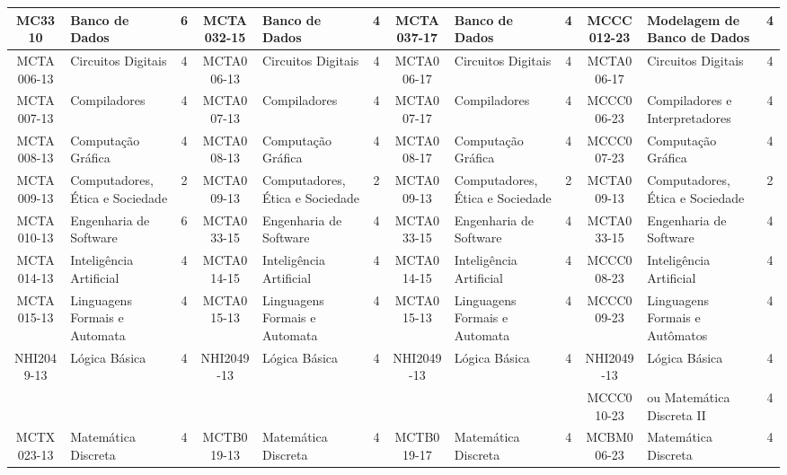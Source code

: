 \documentclass[a4paper]{article}
\begin{document}
\begin{landscape}
{\begin{longtable}{|c|p{.2\textheight}|c||c|p{.2\textheight}|c||c|p{.2\textheight}|c||c|p{.2\textheight}|c|}
    MC3310 & Banco de Dados & 6 &
    MCTA032-15 & Banco de Dados & 4 &
    MCTA037-17 & Banco de Dados & 4 &
    MCCC012-23 & Modelagem de Banco de Dados & 4 \\ \hline

    MCTA006-13 & Circuitos Digitais & 4 &
    MCTA006-13 & Circuitos Digitais & 4 &
    MCTA006-17 & Circuitos Digitais & 4 &
    MCTA006-17 & Circuitos Digitais & 4 \\ \hline

    MCTA007-13 & Compiladores & 4 &
    MCTA007-13 & Compiladores & 4 &
    MCTA007-17 & Compiladores & 4 & 
    MCCC006-23 & Compiladores e Interpretadores & 4 \\ \hline

    MCTA008-13 & Computação Gráfica & 4 &
    MCTA008-13 & Computação Gráfica & 4 &
    MCTA008-17 & Computação Gráfica & 4 &
    MCCC007-23 & Computação Gráfica & 4 \\ \hline

    MCTA009-13 & Computadores, Ética e Sociedade & 2 &
    MCTA009-13 & Computadores, Ética e Sociedade & 2 &
    MCTA009-13 & Computadores, Ética e Sociedade & 2 &
    MCTA009-13 & Computadores, Ética e Sociedade & 2 \\ \hline

    MCTA010-13 & Engenharia de Software & 6 &
    MCTA033-15 & Engenharia de Software & 4 & 
    MCTA033-15 & Engenharia de Software & 4 & 
    MCTA033-15 & Engenharia de Software & 4 \\ \hline

    MCTA014-13 & Inteligência Artificial & 4 &
    MCTA014-15 & Inteligência Artificial & 4 & 
    MCTA014-15 & Inteligência Artificial & 4 &
    MCCC008-23 & Inteligência Artificial & 4 \\ \hline

    MCTA015-13 & Linguagens Formais e Automata & 4 &
    MCTA015-13 & Linguagens Formais e Automata & 4 &
    MCTA015-13 & Linguagens Formais e Automata & 4 & 
    MCCC009-23 & Linguagens Formais e Autômatos & 4 \\ \hline

    NHI2049-13 & Lógica Básica & 4 &
    NHI2049-13 & Lógica Básica & 4 &
    NHI2049-13 & Lógica Básica & 4 &
    NHI2049-13 & Lógica Básica & 4 \\

    & & &
    & & &
    & & &
    MCCC010-23 & ou Matemática Discreta II & 4 \\ \hline

    MCTX023-13 & Matemática Discreta & 4 & 
    MCTB019-13 & Matemática Discreta & 4 &
    MCTB019-17 & Matemática Discreta & 4 &
    MCBM006-23 & Matemática Discreta & 4 \\ \hline


\end{longtable}}
\end{landscape}
\end{document}
